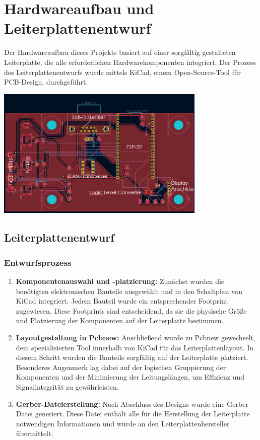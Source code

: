 \chapter{Hardwareaufbau und Leiterplattenentwurf}
\label{sec:Hardware}



\noindent Der Hardwareaufbau dieses Projekts basiert auf einer sorgfältig gestalteten Leiterplatte, die alle erforderlichen Hardwarekomponenten integriert. Der Prozess des Leiterplattenentwurfs wurde mittels KiCad, einem Open-Source-Tool für PCB-Design, durchgeführt.\\

\begin {centering}
\includegraphics[width=0.75\textwidth]{img/Leiterplate.png}
\label{fig: Leiterplattenentwurf}
\end {centering}  

\section{Leiterplattenentwurf}
\subsection{Entwurfsprozess}
\begin{enumerate}
    \item \textbf{Komponentenauswahl und -platzierung:} Zunächst wurden die benötigten elektronischen Bauteile ausgewählt und in den Schaltplan von KiCad integriert. Jedem Bauteil wurde ein entsprechender Footprint zugewiesen. Diese Footprints sind entscheidend, da sie die physische Größe und Platzierung der Komponenten auf der Leiterplatte bestimmen.
    \item \textbf{Layoutgestaltung in Pcbnew:} Anschließend wurde zu Pcbnew gewechselt, dem spezialisierten Tool innerhalb von KiCad für das Leiterplattenlayout. In diesem Schritt wurden die Bauteile sorgfältig auf der Leiterplatte platziert. Besonderes Augenmerk lag dabei auf der logischen Gruppierung der Komponenten und der Minimierung der Leitungslängen, um Effizienz und Signalintegrität zu gewährleisten.
    \item \textbf{Gerber-Dateierstellung:} Nach Abschluss des Designs wurde eine Gerber-Datei generiert. Diese Datei enthält alle für die Herstellung der Leiterplatte notwendigen Informationen und wurde an den Leiterplattenhersteller übermittelt.
\end{enumerate}

